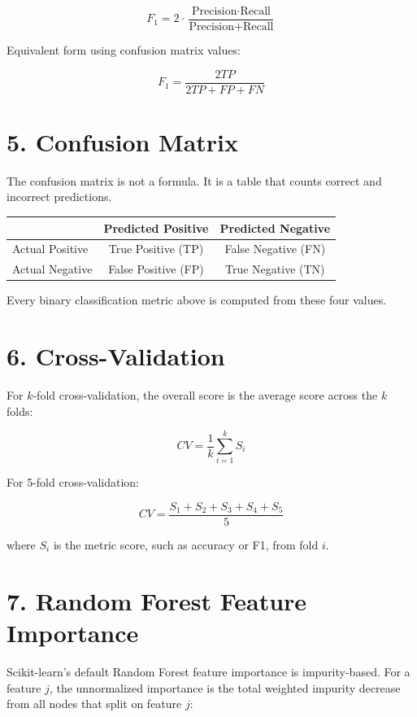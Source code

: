 \documentclass[11pt]{article}
\begin{document}
\[
F_1 =
2 \cdot \frac{\text{Precision} \cdot \text{Recall}}
{\text{Precision} + \text{Recall}}
\]

\noindent Equivalent form using confusion matrix values:

\[
F_1 =
\frac{2TP}{2TP + FP + FN}
\]

\section*{5. Confusion Matrix}

The confusion matrix is not a formula. It is a table that counts correct and
incorrect predictions.

\begin{center}
\begin{tabular}{lcc}
\toprule
 & Predicted Positive & Predicted Negative \\
\midrule
Actual Positive & True Positive (TP) & False Negative (FN) \\
Actual Negative & False Positive (FP) & True Negative (TN) \\
\bottomrule
\end{tabular}
\end{center}

\noindent Every binary classification metric above is computed from these four
values.

\section*{6. Cross-Validation}

For \(k\)-fold cross-validation, the overall score is the average score across
the \(k\) folds:

\[
CV =
\frac{1}{k}\sum_{i=1}^{k} S_i
\]

\noindent For 5-fold cross-validation:

\[
CV =
\frac{S_1 + S_2 + S_3 + S_4 + S_5}{5}
\]

\noindent where \(S_i\) is the metric score, such as accuracy or F1, from fold \(i\).

\section*{7. Random Forest Feature Importance}

Scikit-learn's default Random Forest feature importance is impurity-based. For a
feature \(j\), the unnormalized importance is the total weighted impurity decrease
from all nodes that split on feature \(j\):
\end{document}
